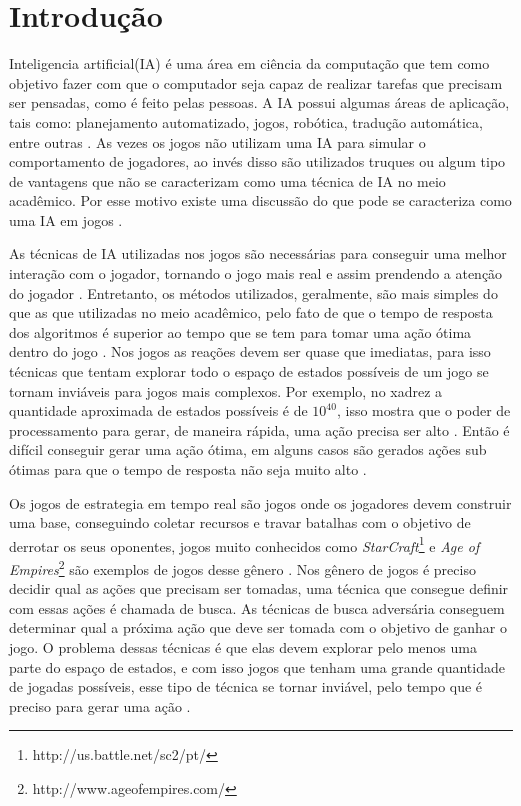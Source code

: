 \chapter{\label{chap:intro}Introdução}

Inteligencia artificial(IA) é uma área em ciência da computação que tem como objetivo fazer com que o computador seja capaz de realizar tarefas que precisam ser pensadas, como é feito pelas pessoas.  
A IA possui algumas áreas de aplicação, tais como: planejamento automatizado, jogos, robótica, tradução automática, entre outras \cite{intelligence2003modern}. As vezes os jogos não utilizam uma IA para simular o comportamento de jogadores, ao invés disso são utilizados truques ou algum tipo de vantagens que não se caracterizam como uma técnica de IA no meio acadêmico. Por esse motivo existe uma discussão do que pode se caracteriza como uma IA em jogos \cite{millington2009artificial}. 

As técnicas de IA utilizadas nos jogos são necessárias para conseguir uma melhor interação com o jogador, tornando o jogo mais real e assim prendendo a atenção do jogador \cite{millington2009artificial}. Entretanto, os métodos utilizados, geralmente, são mais simples do que as que utilizadas no meio acadêmico, pelo fato de que o tempo de resposta dos algoritmos é superior ao tempo que se tem para tomar uma ação ótima dentro do jogo \cite{intelligence2003modern}. 
Nos jogos as reações devem ser quase que imediatas, para isso técnicas que tentam explorar todo o espaço de estados possíveis de um jogo se tornam inviáveis para jogos mais complexos. 
Por exemplo, no xadrez a quantidade aproximada de estados possíveis é de $10^{40}$, isso mostra que o poder de processamento para gerar, de maneira rápida, uma ação precisa ser alto \cite{millington2009artificial}. Então é difícil conseguir gerar uma ação ótima, em alguns casos são gerados ações sub ótimas para que o tempo de resposta não seja muito alto \cite{intelligence2003modern}. 

Os jogos de estrategia em tempo real são jogos onde os jogadores devem construir uma base, conseguindo coletar recursos e travar batalhas com o objetivo de derrotar os seus oponentes, jogos muito conhecidos como \textit{StarCraft}\footnote{http://us.battle.net/sc2/pt/} e \textit{Age of Empires}\footnote{http://www.ageofempires.com/} são exemplos de jogos desse gênero \cite{ontanon2013survey}.
Nos gênero de jogos é preciso decidir qual as ações que precisam ser tomadas, uma técnica que consegue definir com essas ações é chamada de busca. As técnicas de busca adversária conseguem determinar qual a próxima ação que deve ser tomada com o objetivo de ganhar o jogo. O problema dessas técnicas é que elas devem explorar pelo menos uma parte do espaço de estados, e com isso jogos que tenham uma grande quantidade de jogadas possíveis, esse tipo de técnica se tornar inviável, pelo tempo que é preciso para gerar uma ação \cite{ontanon2012experiments}. 

